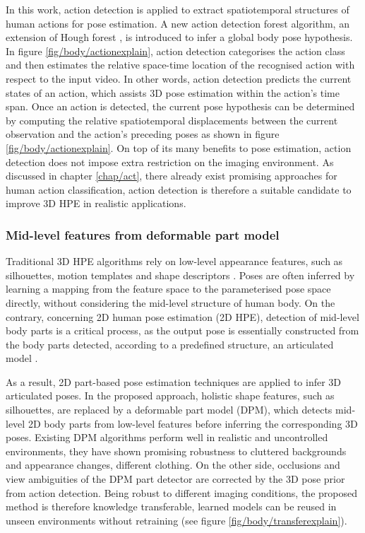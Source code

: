 In this work, action detection is applied to extract spatiotemporal structures of human actions for pose estimation. A new action detection forest algorithm, an extension of Hough forest \cite{Gall2009}, is introduced to infer a global body pose hypothesis.   
In figure \ref{fig/body/actionexplain}, action detection categorises the action class and then estimates the relative space-time location of the recognised action with respect to the input video. In other words, action detection predicts the current states of an action, which assists 3D pose estimation within the action's time span. Once an action is detected, the current pose hypothesis can be determined by computing the relative spatiotemporal displacements between the current observation and the action's preceding poses as shown in figure \ref{fig/body/actionexplain}.   
On top of its many benefits to pose estimation, action detection does not impose extra restriction on the imaging environment. As discussed in chapter \ref{chap/act}, there already exist promising approaches for human action classification, action detection is therefore a suitable candidate to improve 3D HPE in realistic applications.   

\subsubsection{Mid-level features from deformable part model} 

Traditional 3D HPE algorithms rely on low-level appearance features, such as silhouettes, motion templates and shape descriptors \cite{Hogg1983, Rogez2012, Navaratnam2006, Pons-Moll2011, Sigal2012}. Poses are often inferred by learning a mapping from the feature space to the parameterised pose space directly, without considering the mid-level structure of human body.  
On the contrary, concerning 2D human pose estimation (2D HPE), detection of mid-level body parts is a critical process, as the output pose is essentially constructed from the body parts detected, according to a predefined structure, \eg an articulated model \cite{Felzenszwalb2000, Andriluka2009, Yang2011, Eichner2012}.

As a result, 2D part-based pose estimation techniques are applied to infer 3D articulated poses. In the proposed approach, holistic shape features, such as silhouettes, are replaced by a deformable part model (DPM), which detects mid-level 2D body parts from low-level features before inferring the corresponding 3D poses. Existing DPM algorithms perform well in realistic and uncontrolled environments, they have shown promising robustness to cluttered backgrounds and appearance changes, \eg different clothing. On the other side, occlusions and view ambiguities of the DPM part detector are corrected by the 3D pose prior from action detection. Being robust to different imaging conditions, the proposed method is therefore knowledge transferable, learned models can be reused in unseen environments without retraining (see figure \ref{fig/body/transferexplain}). 

